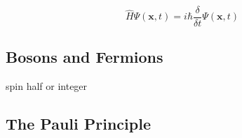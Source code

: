 \begin{equation*}
  \hat{H} \Psi(\mathbf{x},t) = i\hbar \frac{\delta}{\delta
  t}\Psi(\mathbf{x},t) 
\end{equation*}

\subsection{Bosons and Fermions}

spin half or integer


\subsection{The Pauli Principle}



